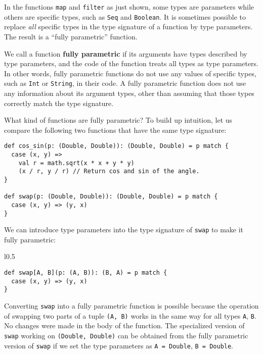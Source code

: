 In the functions \lstinline!map! and \lstinline!filter! as just
shown, some types are parameters while others are specific types,
such as \lstinline!Seq! and \lstinline!Boolean!. It is sometimes
possible to replace \emph{all} specific types in the type signature
of a function by type parameters. The result is a \textsf{``}fully parametric\textsf{''}
function.

We call a function \textbf{fully parametric}
if its arguments have types described by type parameters, and the
code of the function treats all types as type parameters. In other
words, fully parametric functions do not use any values of specific
types, such as \lstinline!Int! or \lstinline!String!, in their code.
A fully parametric function does not use any information about its
argument types, other than assuming that those types correctly match
the type signature.

What kind of functions are fully parametric? To build up intuition,
let us compare the following two functions that have the same type
signature:
\begin{lstlisting}
def cos_sin(p: (Double, Double)): (Double, Double) = p match {
  case (x, y) =>
    val r = math.sqrt(x * x + y * y)
    (x / r, y / r) // Return cos and sin of the angle.
}

def swap(p: (Double, Double)): (Double, Double) = p match {
  case (x, y) => (y, x)
}
\end{lstlisting}
We can introduce type parameters into the type signature of \lstinline!swap!
to make it fully parametric:

\begin{wrapfigure}{l}{0.5\columnwidth}%
\vspace{-0.55\baselineskip}
\begin{lstlisting}
def swap[A, B](p: (A, B)): (B, A) = p match {
  case (x, y) => (y, x)
}
\end{lstlisting}
\vspace{-0.95\baselineskip}
\end{wrapfigure}%

\noindent Converting \lstinline!swap! into a fully parametric function
is possible because the operation of swapping two parts of a tuple
\lstinline!(A, B)! works in the same way for all types \lstinline!A!,
\lstinline!B!. No changes were made in the body of the function.
The specialized version of \lstinline!swap! working on \lstinline!(Double, Double)!
can be obtained from the fully parametric version of \lstinline!swap!
if we set the type parameters as \lstinline!A = Double!, \lstinline!B = Double!.

